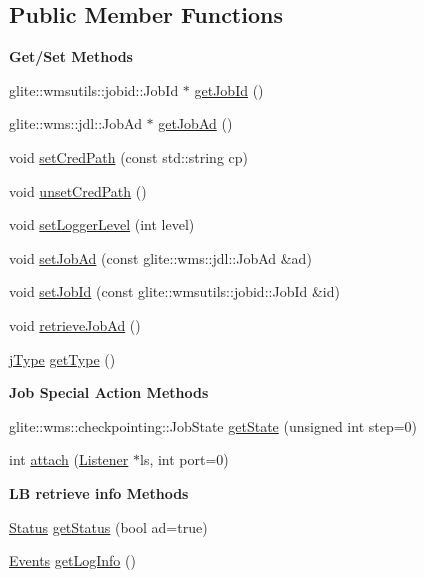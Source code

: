 \subsection*{Public Member Functions}
\begin{Indent}{\bf Get/Set Methods}\par
\begin{CompactItemize}
\item 
glite::wmsutils::jobid::Job\-Id $\ast$ \hyperlink{classglite_1_1wmsui_1_1api_1_1Job_z17_0}{get\-Job\-Id} ()
\item 
glite::wms::jdl::Job\-Ad $\ast$ \hyperlink{classglite_1_1wmsui_1_1api_1_1Job_z17_1}{get\-Job\-Ad} ()
\item 
void \hyperlink{classglite_1_1wmsui_1_1api_1_1Job_z17_2}{set\-Cred\-Path} (const std::string cp)
\item 
void \hyperlink{classglite_1_1wmsui_1_1api_1_1Job_z17_3}{unset\-Cred\-Path} ()
\item 
void \hyperlink{classglite_1_1wmsui_1_1api_1_1Job_z17_4}{set\-Logger\-Level} (int level)
\item 
void \hyperlink{classglite_1_1wmsui_1_1api_1_1Job_z17_5}{set\-Job\-Ad} (const glite::wms::jdl::Job\-Ad \&ad)
\item 
void \hyperlink{classglite_1_1wmsui_1_1api_1_1Job_z17_6}{set\-Job\-Id} (const glite::wmsutils::jobid::Job\-Id \&id)
\item 
void \hyperlink{classglite_1_1wmsui_1_1api_1_1Job_z17_7}{retrieve\-Job\-Ad} ()
\item 
\hyperlink{namespaceglite_1_1wmsui_1_1api_a31}{j\-Type} \hyperlink{classglite_1_1wmsui_1_1api_1_1Job_z17_8}{get\-Type} ()
\end{CompactItemize}
\end{Indent}
\begin{Indent}{\bf Job Special Action Methods}\par
\begin{CompactItemize}
\item 
glite::wms::checkpointing::Job\-State \hyperlink{classglite_1_1wmsui_1_1api_1_1Job_z19_0}{get\-State} (unsigned int step=0)
\item 
int \hyperlink{classglite_1_1wmsui_1_1api_1_1Job_z19_1}{attach} (\hyperlink{classglite_1_1wmsui_1_1api_1_1Listener}{Listener} $\ast$ls, int port=0)
\end{CompactItemize}
\end{Indent}
\begin{Indent}{\bf LB retrieve info Methods}\par
\begin{CompactItemize}
\item 
\hyperlink{namespaceglite_1_1wmsui_1_1api_a24}{Status} \hyperlink{classglite_1_1wmsui_1_1api_1_1Job_z21_0}{get\-Status} (bool ad=true)
\item 
\hyperlink{namespaceglite_1_1wmsui_1_1api_a23}{Events} \hyperlink{classglite_1_1wmsui_1_1api_1_1Job_z21_1}{get\-Log\-Info} ()
\end{CompactItemize}
\end{Indent}
